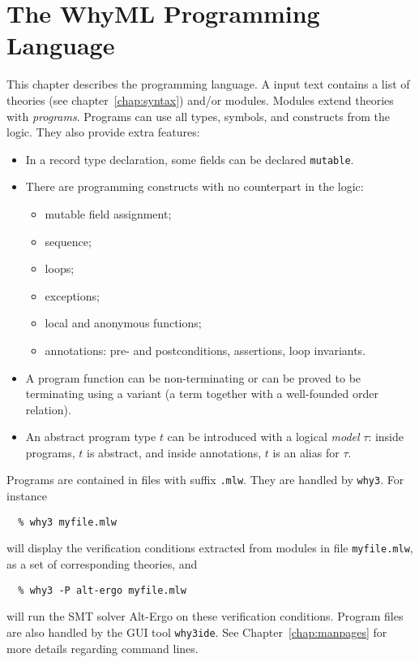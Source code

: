 \chapter{The WhyML Programming Language}
\label{chap:whyml}

This chapter describes the \whyml programming language.
A \whyml input text contains a list of theories (see
chapter~\ref{chap:syntax}) and/or modules.
Modules extend theories with \emph{programs}.
Programs can use all types, symbols, and constructs from the logic.
They also provide extra features:
\begin{itemize}
\item
  In a record type declaration, some fields can be declared
  \texttt{mutable}.
\item
  There are programming constructs with no counterpart in the logic:
  \begin{itemize}
  \item mutable field assignment;
  \item sequence;
  \item loops;
  \item exceptions;
  \item local and anonymous functions;
  \item annotations: pre- and postconditions, assertions, loop invariants.
  \end{itemize}
\item
  A program function can be non-terminating or can be proved
  to be terminating using a variant (a term together with a well-founded
  order relation).
\item
  An abstract program type $t$ can be introduced with a logical
  \emph{model} $\tau$: inside programs, $t$ is abstract, and inside
  annotations, $t$ is an alias for $\tau$.
\end{itemize}
%
Programs are contained in files with suffix \verb|.mlw|.
They are handled by \texttt{why3}. For instance
\begin{verbatim}
  % why3 myfile.mlw
\end{verbatim}
will display the verification conditions extracted from modules in
file \texttt{myfile.mlw}, as a set of corresponding theories, and
\begin{verbatim}
  % why3 -P alt-ergo myfile.mlw
\end{verbatim}
will run the SMT solver Alt-Ergo on these verification conditions.
Program files are also handled by the GUI tool \texttt{why3ide}.
See Chapter~\ref{chap:manpages} for more details regarding command lines.

